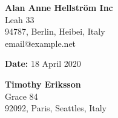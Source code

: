 \documentclass[a4paper]{letter}
\begin{document}
\RaggedRight
%
\begin{minipage}[t]{0.5\textwidth}
	\begin{flushleft}

	\end{flushleft}
\end{minipage}%
\begin{minipage}[t]{0.5\textwidth}
 	\begin{flushright}
		\textbf{\huge  Alan Anne Hellström Inc} \\
		{\large Leah 33}\\
		{\large 94787, Berlin, Heibei, Italy }\\
		{\large email@example.net}
	
 	\end{flushright}
\end{minipage}%

\begin{minipage}[t]{0.5\textwidth}
	\begin{flushleft}

	\end{flushleft}
\end{minipage}%
\begin{minipage}[t]{0.5\textwidth}
 	\begin{flushright}
		\textbf{\large Date:} 18 April 2020\\		
 	\end{flushright}
\end{minipage}%

\begin{minipage}[t]{0.5\textwidth}
	\begin{flushleft}
	 	\textbf{\large Timothy Eriksson } \\
		{\large Grace 84}\\
		{\large 92092, Paris, Seattles, Italy }\\
	\end{flushleft}
\end{minipage}
\begin{minipage}[t]{0.5\textwidth}
 	\begin{flushright} 	
	
 	\end{flushright}
\end{minipage}%
\end{document}
